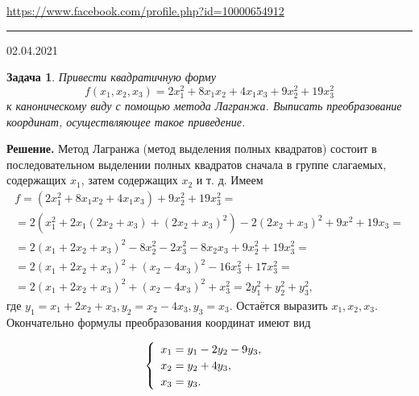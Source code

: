 \documentclass[12pt]{article}
\begin{document}


\begin{flushleft}
\url{https://www.facebook.com/profile.php?id=10000654912}
\end{flushleft}
\hrule 
\begin{flushright}
02.04.2021
\end{flushright}
\bigskip


\newtheorem*{task}{Задача}
\begin{task}
Привести квадратичную форму 
\begin{equation*}
    f(x_1,x_2,x_3)=2x_1^2 + 8x_1x_2 + 4x_1x_3 + 9x_2^2 + 19x_3^2
\end{equation*}
к каноническому виду с помощью метода Лагранжа. Выписать преобразование координат, осуществляющее такое приведение.
\end{task}

\noindent\textbf{Решение.} Метод Лагранжа (метод выделения полных квадратов) состоит в последовательном выделении полных квадратов сначала в группе слагаемых, содержащих $x_1$, затем содержащих $x_2$ и т. д. Имеем
\begin{gather*}
    f = (2x_1^2 + 8x_1x_2 + 4x_1x_3) + 9x_2^2 + 19x_3^2 = \\
    = 2(x_1^2 + 2x_1(2x_2 + x_3) + (2x_2 + x_3)^2) - 2(2x_2+x_3)^2 + 9x^2 + 19x_3 = \\
    = 2(x_1 + 2x_2 + x_3)^2 - 8x_2^2 - 2x_3^2 - 8x_2x_3 + 9x_2^2 + 19x_3^2 = \\ 
    = 2(x_1 + 2x_2 + x_3)^2 + (x_2 - 4x_3)^2 - 16x_3^2 + 17x_3^2 = \\ 
    = 2(x_1 + 2x_2 + x_3)^2 + (x_2 - 4x_3)^2 + x_3^2 = 2y_1^2 + y_2^2 + y_3^2,
\end{gather*}
где $y_1 = x_1 + 2x_2 + x_3, y_2 = x_2 - 4x_3, y_3 = x_3.$ Остаётся выразить $x_1, x_2, x_3$. Окончательно формулы преобразования координат имеют вид

\begin{equation*}
\begin{cases}
    \enskip x_1 = y_1 - 2y_2 - 9y_3, \\
    \enskip x_2 = y_2 + 4y_3, \\
    \enskip x_3 = y_3. \\
\end{cases}
\end{equation*}
\end{document}
